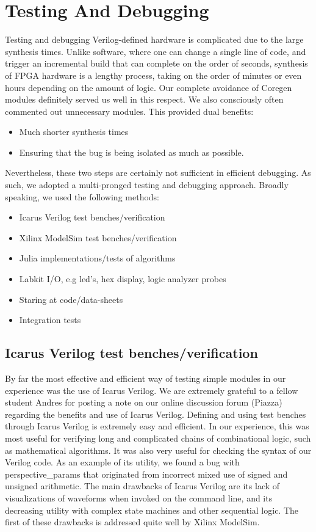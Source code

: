 \documentclass{article}
\begin{document}
\section{Testing And Debugging}

Testing and debugging Verilog-defined hardware is complicated due to the large synthesis times.
Unlike software, where one can change a single line of code,
and trigger an incremental build that can complete on the order of seconds,
synthesis of FPGA hardware is a lengthy process,
taking on the order of minutes or even hours depending on the amount of logic.
Our complete avoidance of Coregen modules definitely served us well in this respect.
We also consciously often commented out unnecessary modules.
This provided dual benefits:
\begin{itemize}
\item Much shorter synthesis times
\item Ensuring that the bug is being isolated as much as possible.
\end{itemize}
Nevertheless, these two steps are certainly not sufficient in efficient debugging.
As such, we adopted a multi-pronged testing and debugging approach.
Broadly speaking, we used the following methods:
\begin{itemize}
\item Icarus Verilog test benches/verification
\item Xilinx ModelSim test benches/verification
\item Julia implementations/tests of algorithms
\item Labkit I/O, e.g led's, hex display, logic analyzer probes
\item Staring at code/data-sheets
\item Integration tests
\end{itemize}

\subsection{Icarus Verilog test benches/verification}
By far the most effective and efficient way of testing simple modules in our experience was the use of Icarus Verilog.
We are extremely grateful to a fellow student Andres for posting a note on our online discussion forum (Piazza) regarding the benefits and use of Icarus Verilog.
Defining and using test benches through Icarus Verilog is extremely easy and efficient.
In our experience, this was most useful for verifying long and complicated chains of combinational logic, such as mathematical algorithms.
It was also very useful for checking the syntax of our Verilog code.
As an example of its utility, we found a bug with perspective\_params that originated from incorrect mixed use of signed and unsigned arithmetic.
The main drawbacks of Icarus Verilog are its lack of visualizations of waveforms when invoked on the command line,
and its decreasing utility with complex state machines and other sequential logic.
The first of these drawbacks is addressed quite well by Xilinx ModelSim.
\end{document}
